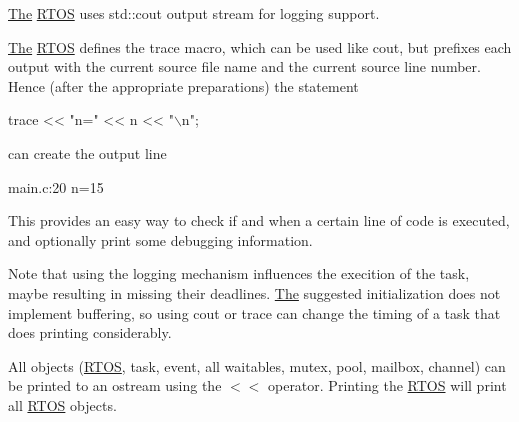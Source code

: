 \hyperlink{class_the}{The} \hyperlink{class_r_t_o_s}{R\+T\+OS} uses std\+::cout output stream for logging support.

\hyperlink{class_the}{The} \hyperlink{class_r_t_o_s}{R\+T\+OS} defines the trace macro, which can be used like cout, but prefixes each output with the current source file name and the current source line number. Hence (after the appropriate preparations) the statement


\begin{DoxyCode}
trace << \textcolor{stringliteral}{"n="} << n << \textcolor{stringliteral}{"\(\backslash\)n"};
\end{DoxyCode}


can create the output line


\begin{DoxyCode}
main.c:20 n=15
\end{DoxyCode}


This provides an easy way to check if and when a certain line of code is executed, and optionally print some debugging information.

Note that using the logging mechanism influences the execition of the task, maybe resulting in missing their deadlines. \hyperlink{class_the}{The} suggested initialization does not implement buffering, so using cout or trace can change the timing of a task that does printing considerably.

All objects (\hyperlink{class_r_t_o_s}{R\+T\+OS}, task, event, all waitables, mutex, pool, mailbox, channel) can be printed to an ostream using the $<$$<$ operator. Printing the \hyperlink{class_r_t_o_s}{R\+T\+OS} will print all \hyperlink{class_r_t_o_s}{R\+T\+OS} objects. 